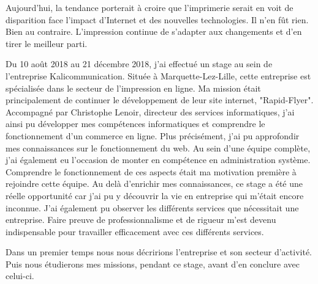 Aujourd'hui, la tendance porterait à croire que l'imprimerie serait en voit de disparition face l'impact d'Internet et des nouvelles technologies. Il n'en fût rien. Bien au contraire. L'impression continue de s'adapter aux changements et d'en tirer le meilleur parti.\newline

Du 10 août 2018 au 21 décembre 2018, j'ai effectué un stage au sein de l'entreprise Kalicommunication.
Située à Marquette-Lez-Lille, cette entreprise est spécialisée dans le secteur de l'impression en ligne.\newline
Ma mission était principalement de continuer le développement de leur site internet, "Rapid-Flyer".
Accompagné par Christophe Lenoir, directeur des services informatiques, j'ai ainsi pu développer mes compétences informatiques et comprendre le fonctionnement d'un commerce en ligne. Plus précisément, j'ai pu approfondir mes connaissances sur le fonctionnement du web. Au sein d'une équipe complète, j'ai également eu l'occasion de monter en compétence en administration système. Comprendre le fonctionnement de ces aspects était ma motivation première à rejoindre cette équipe.\newline
Au delà d'enrichir mes connaissances, ce stage a été une réelle opportunité car j'ai pu y découvrir la vie en entreprise qui m'était encore inconnue. J'ai également pu observer les différents services que nécessitait une entreprise. Faire preuve de professionnalisme et de rigueur m'est devenu indispensable pour travailler efficacement avec ces différents services.\newline

Dans un premier temps nous nous décririons l'entreprise et son secteur d'activité. Puis nous étudierons mes missions, pendant ce stage, avant d'en conclure avec celui-ci.